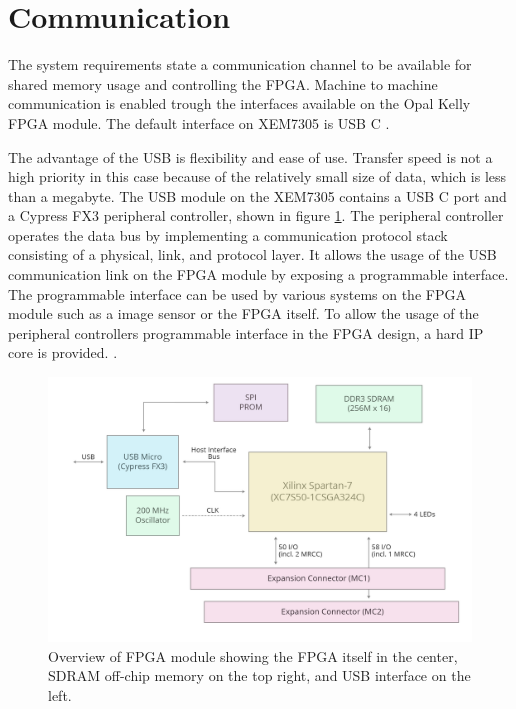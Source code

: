 \documentclass[12pt]{report}
\begin{document}
\section{Communication}
The system requirements state a communication channel to be available for shared memory usage and controlling the FPGA. Machine to machine communication is enabled trough the interfaces available on the Opal Kelly FPGA module. The default interface on XEM7305 is USB C \citep{XEM7305Man}.
\par
The advantage of the USB is flexibility and ease of use. Transfer speed is not a high priority in this case because of the relatively small size of data, which is less than a megabyte. The USB module on the XEM7305 contains a USB C port and a Cypress FX3 peripheral controller, shown in figure \ref{fig:xemOverview}.
The peripheral controller operates the data bus by implementing a communication protocol stack consisting of a physical, link, and protocol layer. It allows the usage of the USB communication link on the FPGA module by exposing a programmable interface. The programmable interface can be used by various systems on the FPGA module such as a image sensor or the FPGA itself. To allow the usage of the peripheral controllers programmable interface in the FPGA design, a hard IP core is provided. \citep{XEM7305Man} \citep{FX3Man}.

\begin{figure}
    \centering
    \includegraphics[scale=0.4]{figures/2XEM7305-BlockDiagram.png}
    \caption{Overview of FPGA module showing the FPGA itself in the center, SDRAM off-chip memory on the top right, and USB interface on the left. \citep{XEM7305Man}}
    \label{fig:xemOverview}
\end{figure}
\end{document}
